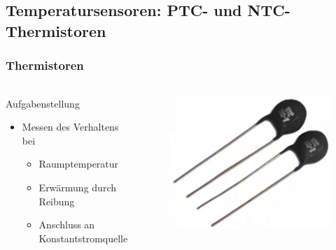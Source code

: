 \subsection{Temperatursensoren: PTC- und NTC-Thermistoren} %
\label{sub:Temperatursensoren: PTC- und NTC-Thermistoren}
\begin{frame}
    \frametitle{Thermistoren}
    \framesubtitle{}
    \begin{columns}[c]
            \begin{block}{Aufgabenstellung}
                 \begin{itemize}
                     \item Messen des Verhaltens bei
                        \begin{itemize}
                            \item Raumptemperatur
                            \item Erwärmung durch Reibung
                            \item Anschluss an Konstantstromquelle
                        \end{itemize}
                 \end{itemize}
            \end{block}
            \begin{figure}[H]
            \begin{center}
                   \includegraphics[scale=0.3]{./img/misc/thermistor.jpg}
            \end{center}
            \end{figure}
    \end{columns}
\end{frame}
